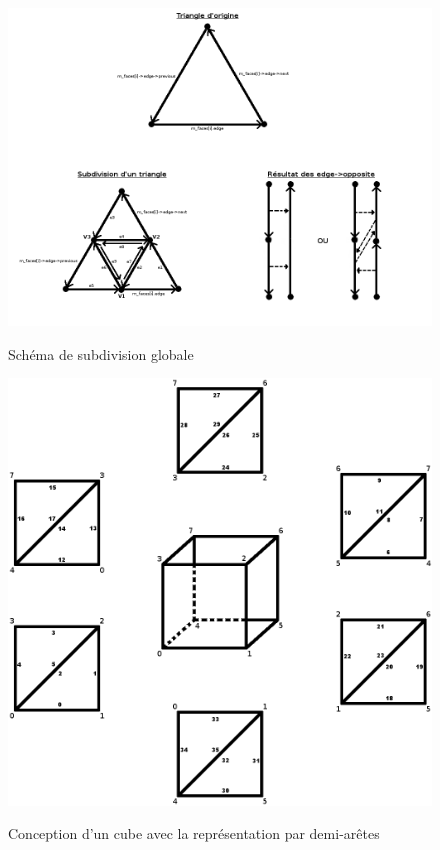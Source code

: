 \documentclass[a4paper]{memoir}
\begin{document}
			\begin{figure}
				\hspace{-3cm}\includegraphics[scale=0.5]{img/subdivide.png}
				\label{fig:subdivide}
				\caption{Schéma de subdivision globale}
			\end{figure}
			
			\begin{figure}
				\hspace{-4cm}\includegraphics[scale=0.5]{img/cube2.png}
				\label{fig:cube}
				\caption{Conception d'un cube avec la représentation par demi-arêtes}
			\end{figure}
\end{document}

